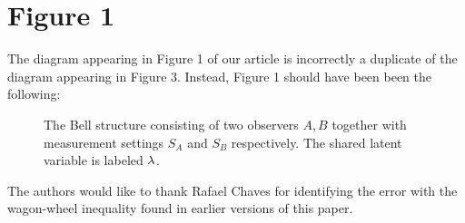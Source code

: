 \documentclass[aps, 10pt, english, twoside, pra, nofootinbib, tightenlines, longbibliography, superscriptaddress, notitlepage]{revtex4-1}
\begin{document}
    \section{Figure 1}
    The diagram appearing in Figure 1 of our article is incorrectly a duplicate of the diagram appearing in Figure 3. Instead, Figure 1 should have been been the following:
    \begin{figure}
        \centering
        \caption{The Bell structure consisting of two observers $A, B$ together with measurement settings $S_{A}$ and $S_{B}$ respectively. The shared latent variable is labeled $\lambda$.}
        \label{fig:bell_structure}
    \end{figure}




    \begin{acknowledgments}
        The authors would like to thank Rafael Chaves for identifying the error with the wagon-wheel inequality found in earlier versions of this paper.
    \end{acknowledgments}

\end{document}

